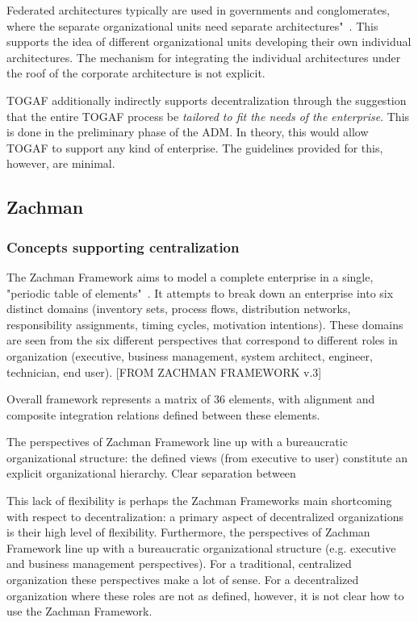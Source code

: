 Federated architectures typically are used in governments and conglomerates, where the separate organizational units need separate architectures"~\cite{togaf9.1}. This supports the idea of different organizational units developing their own individual architectures. The mechanism for integrating the individual architectures under the roof of the corporate architecture is not explicit. 


TOGAF additionally indirectly supports decentralization through the suggestion that the entire TOGAF process be\textit{ tailored to fit the needs of the enterprise}. This is done in the preliminary phase of the ADM. In theory, this would allow TOGAF to support any kind of enterprise. The guidelines provided for this, however, are minimal. 

\subsection{Zachman}
\subsubsection{Concepts supporting centralization}

The Zachman Framework aims to model a complete enterprise in a single, "periodic table of elements"~\cite{Bente2012}. It attempts to break down an enterprise into six distinct domains (inventory sets, process flows, distribution networks, responsibility assignments, timing cycles, motivation intentions). These domains are seen from the six different perspectives that correspond to different roles in organization (executive, business management, system architect, engineer, technician, end user).  [FROM ZACHMAN FRAMEWORK v.3]

Overall framework represents a matrix of 36 elements, with alignment and composite integration relations defined between these elements.

The perspectives of Zachman Framework line up with a bureaucratic organizational structure: the defined views (from executive to user) constitute an explicit organizational hierarchy. Clear separation between 


This lack of flexibility is perhaps the Zachman Frameworks main shortcoming with respect to decentralization: a primary aspect of decentralized organizations is their high level of flexibility. Furthermore, the perspectives of Zachman Framework line up with a bureaucratic organizational structure (e.g. executive and business management perspectives). For a traditional, centralized organization these perspectives make a lot of sense. For a decentralized organization where these roles are not as defined, however, it is not clear how to use the Zachman Framework. 

